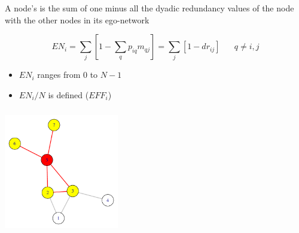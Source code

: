 \documentclass[8pt]{beamer}
\begin{document}

\begin{frame}
\frametitle{\insertsection}
\framesubtitle{\insertsubsection}


A node's {\color{blue}{effective network size}} is the sum of one minus all the dyadic redundancy values of the node with the other nodes in its ego-network \cite{Burt1992}

\begin{equation*}
EN_{i} = \sum_{j}{[1 - \sum_{q}{p_{iq}m_{qj}}]} = \sum_{j}{[1 - dr_{ij}]} \;\;\;\;\;\; q \neq i, j
\end{equation*}

\begin{itemize}
	\item $EN_{i}$ ranges from $0$ to $N-1$
	\item $EN_{i}/N$ is defined {\color{blue}{efficiency}} ($EFF_{i}$)
\end{itemize}

\end{frame}


\begin{frame}
\frametitle{\insertsection}
\framesubtitle{\insertsubsection}

\centering
\includegraphics[width=5cm]{egonet}

\medskip


\end{frame}

\end{document}
